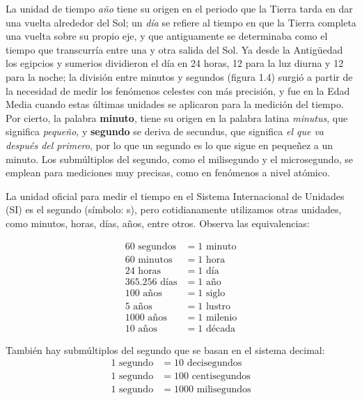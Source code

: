 \documentclass[11pt]{book}
\begin{document}
La unidad de tiempo \emph{año} tiene su origen en el periodo que la Tierra tarda
en dar una vuelta alrededor del Sol; un \emph{d\'ia}
se refiere al tiempo en que la Tierra completa una vuelta sobre su propio eje,
y que antiguamente se determinaba como el tiempo
que transcurr\'ia entre una y otra salida del Sol. Ya desde la Antigüedad los
egipcios y sumerios dividieron el d\'ia en 24 horas,
12 para la luz diurna y 12 para la noche; la divisi\'on entre minutos y segundos
(figura 1.4) surgi\'o a partir de la necesidad
de medir los fen\'omenos celestes con m\'as precisi\'on, y fue en la Edad Media
cuando estas \'ultimas unidades se aplicaron para la
medici\'on del tiempo. Por cierto, la palabra \textbf{minuto}, tiene su origen en
la palabra latina \emph{minutus}, que significa \emph{pequeño},
y \textbf{segundo} se deriva de secundus, que significa \emph{el que va despu\'es del
  primero}, por lo que un segundo  es lo que
sigue en pequeñez a un minuto. Los subm\'ultiplos del segundo, como el
milisegundo y el microsegundo, se emplean para mediciones
muy precisas, como en fen\'omenos a nivel at\'omico.

La unidad oficial para medir el tiempo en el Sistema Internacional de Unidades
(SI) es el segundo (s\'imbolo: s), pero
cotidianamente utilizamos otras unidades, como minutos, horas, d\'ias, años,
entre otros. Observa las equivalencias:

\begin{minipage}[b]{0.5\linewidth}
  \begin{align*}
    60 \text{ segundos}    & = 1 \text{ minuto}   \\
    60 \text{ minutos}     & = 1 \text{ hora}     \\
    24 \text{ horas}       & = 1 \text{ d\'ia}    \\
    365.256 \text{ d\'ias} & = 1 \text{ año}      \\
    100 \text{ años}       & = 1 \text{ siglo}    \\
    5 \text{ años}         & = 1 \text{ lustro}   \\
    1 000 \text{ años}     & = 1 \text{ milenio}  \\
    10 \text{ años}        & = 1 \text{ d\'ecada}
  \end{align*}
\end{minipage}%
\begin{minipage}[b]{0.5\linewidth}
  Tambi\'en hay subm\'ultiplos del segundo que se basan en el sistema decimal:
  \begin{align*}
    1 \text{ segundo} & = 10   \text{ decisegundos}  \\
    1 \text{ segundo} & = 100  \text{ centisegundos} \\
    1 \text{ segundo} & = 1000 \text{ milisegundos}
  \end{align*}
\end{minipage}
\end{document}
